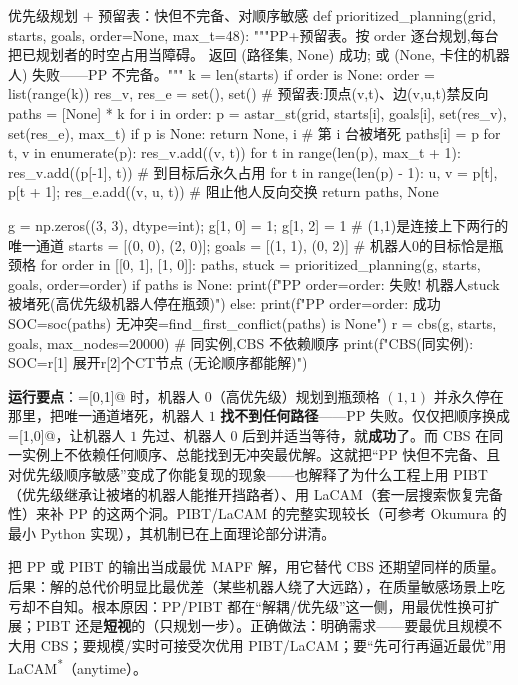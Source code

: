 \begin{codebox}[Python]{优先级规划 $+$ 预留表：快但不完备、对顺序敏感}
def prioritized_planning(grid, starts, goals, order=None, max_t=48):
    """PP+预留表。按 order 逐台规划,每台把已规划者的时空占用当障碍。
    返回 (路径集, None) 成功; 或 (None, 卡住的机器人) 失败——PP 不完备。"""
    k = len(starts)
    if order is None: order = list(range(k))
    res_v, res_e = set(), set()                          # 预留表:顶点(v,t)、边(v,u,t)禁反向
    paths = [None] * k
    for i in order:
        p = astar_st(grid, starts[i], goals[i], set(res_v), set(res_e), max_t)
        if p is None: return None, i                     # 第 i 台被堵死
        paths[i] = p
        for t, v in enumerate(p): res_v.add((v, t))
        for t in range(len(p), max_t + 1): res_v.add((p[-1], t))     # 到目标后永久占用
        for t in range(len(p) - 1):
            u, v = p[t], p[t + 1]; res_e.add((v, u, t))              # 阻止他人反向交换
    return paths, None

g = np.zeros((3, 3), dtype=int); g[1, 0] = 1; g[1, 2] = 1   # (1,1)是连接上下两行的唯一通道
starts = [(0, 0), (2, 0)]; goals = [(1, 1), (0, 2)]         # 机器人0的目标恰是瓶颈格
for order in [[0, 1], [1, 0]]:
    paths, stuck = prioritized_planning(g, starts, goals, order=order)
    if paths is None:
        print(f"PP order={order}: 失败! 机器人{stuck}被堵死(高优先级机器人停在瓶颈)")
    else:
        print(f"PP order={order}: 成功 SOC={soc(paths)} 无冲突={find_first_conflict(paths) is None}")
r = cbs(g, starts, goals, max_nodes=20000)                 # 同实例,CBS 不依赖顺序
print(f"CBS(同实例): SOC={r[1]} 展开{r[2]}个CT节点 (无论顺序都能解)")
\end{codebox}

\textbf{运行要点}：\verb@order=[0,1]@ 时，机器人 $0$（高优先级）规划到瓶颈格 $(1,1)$ 并永久停在那里，把唯一通道堵死，机器人 $1$ \textbf{找不到任何路径}——PP 失败。仅仅把顺序换成 \verb@order=[1,0]@，让机器人 $1$ 先过、机器人 $0$ 后到并适当等待，就\textbf{成功}了。而 CBS 在同一实例上不依赖任何顺序、总能找到无冲突最优解。这就把“PP 快但不完备、且对优先级顺序敏感”变成了你能复现的现象——也解释了为什么工程上用 PIBT（优先级继承让被堵的机器人能推开挡路者）、用 LaCAM（套一层搜索恢复完备性）来补 PP 的这两个洞。PIBT/LaCAM 的完整实现较长（可参考 Okumura 的 \verb@pypibt@ 最小 Python 实现），其机制已在上面理论部分讲清。

\begin{pitfall}
把 PP 或 PIBT 的输出当成最优 MAPF 解，用它替代 CBS 还期望同样的质量。后果：解的总代价明显比最优差（某些机器人绕了大远路），在质量敏感场景上吃亏却不自知。根本原因：PP/PIBT 都在“解耦/优先级”这一侧，用最优性换可扩展；PIBT 还是\textbf{短视}的（只规划一步）。正确做法：明确需求——要最优且规模不大用 CBS；要规模/实时可接受次优用 PIBT/LaCAM；要“先可行再逼近最优”用 LaCAM\textsuperscript{*}（anytime）。
\end{pitfall}

